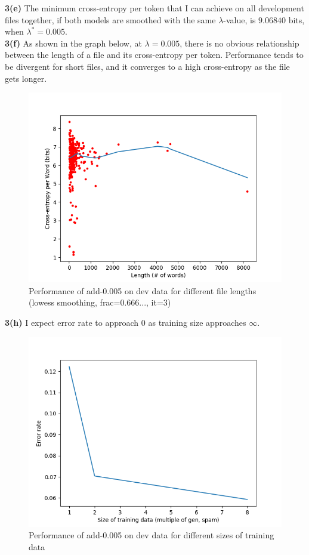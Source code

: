 \documentclass{article}
\begin{document}
\textbf{3(e)} The minimum cross-entropy per token that I can achieve on all development files together, if both models are smoothed with the same $\lambda$-value, is $9.06840$ bits, when $\lambda^* = 0.005$. \\

\textbf{3(f)} As shown in the graph below, at $\lambda = 0.005$, there is no obvious relationship between the length of a file and its cross-entropy per token. Performance tends to be divergent for short files, and it converges to a high cross-entropy as the file gets longer. \\

\begin{figure}[!h]
	\caption{Performance of add-0.005 on dev data for different file lengths (lowess smoothing, frac=0.666..., it=3)}
	\centering
	\includegraphics[width=\textwidth]{3f}
\end{figure}

\textbf{3(h)} I expect error rate to approach $0$ as training size approaches $\infty$. \\

\begin{figure}[!h]
	\caption{Performance of add-0.005 on dev data for different sizes of training data}
	\centering
	\includegraphics[width=\textwidth]{3h}
\end{figure}
\end{document}

